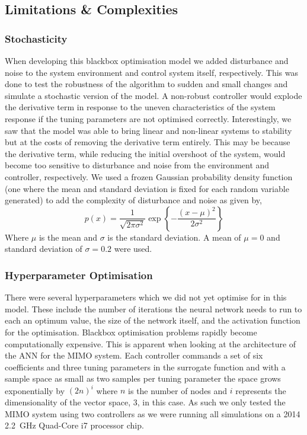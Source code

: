 \documentclass[conference]{IEEEtran}
\theoremstyle{definition}
\begin{document}
\subsection{Limitations \& Complexities}
\subsubsection{Stochasticity}
\noindent When developing this blackbox optimisation model we added disturbance and noise to the system environment and control system itself, respectively. This was done to test the robustness of the algorithm to sudden and small changes and simulate a stochastic version of the model. A non-robust controller would explode the derivative term in response to the uneven characteristics of the system response if the tuning parameters are not optimised correctly. Interestingly, we saw that the model was able to bring linear and non-linear systems to stability but at the costs of removing the derivative term entirely. This may be because the derivative term, while reducing the initial overshoot of the system, would become too sensitive to disturbance and noise from the environment and controller, respectively. We used a frozen Gaussian probability density function (one where the mean and standard deviation is fixed for each random variable generated) to add the complexity of disturbance and noise as given by,
\begin{equation}
    p(x) = \frac{1}{\sqrt{2\pi \sigma^2}} \exp{\left\{-\frac{ (x-\mu)^2}{2\sigma^2} \right\}}
\end{equation}
\vspace{1mm}
\noindent Where $\mu$ is the mean and $\sigma$ is the standard deviation. A mean of $\mu=0$ and standard deviation of $\sigma=0.2$ were used. 

\subsubsection{Hyperparameter Optimisation}
There were several hyperparameters which we did not yet optimise for in this model. These include the number of iterations the neural network needs to run to each an optimum value, the size of the network itself, and the activation function for the optimisation. Blackbox optimisation problems rapidly become computationally expensive. This is apparent when looking at the architecture of the ANN for the MIMO system. Each controller commands a set of six coefficients and three tuning parameters in the surrogate function and with a sample space as small as two samples per tuning parameter the space grows exponentially by $(2n)^i$ where $n$ is the number of nodes and $i$ represents the dimensionality of the vector space, 3, in this case. As such we only tested the MIMO system using two controllers as we were running all simulations on a 2014 \SI{2.2}{GHz} Quad-Core i7 processor chip. 
\end{document}

